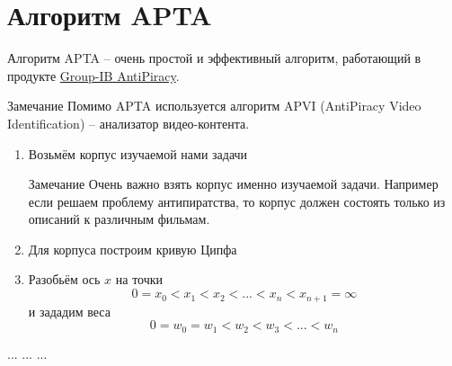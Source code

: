 \section{Алгоритм APTA}\label{section:APTA}


\begin{frame}{Алгоритм APTA}
	 -- 
	очень простой и эффективный алгоритм, работающий
	в продукте \href{https://www.group-ib.ru/antipiracy.html}{Group-IB AntiPiracy}.
	
	\begin{block}{Замечание}
	Помимо APTA используется алгоритм APVI (AntiPiracy Video Identification) 
	-- анализатор видео-контента. 
	\end{block}
\end{frame}

\begin{frame}
	\begin{enumerate}
		\item 
		Возьмём корпус изучаемой нами задачи
		
		\begin{block}{Замечание}
		Очень важно взять корпус именно изучаемой задачи.
		Например если решаем проблему антипиратства, то корпус должен состоять 
		только из описаний к различным фильмам.
		\end{block}
		\item Для корпуса построим кривую Ципфа
		\item Разобьём ось $x$ на точки 
		\begin{equation}
		0 = x_0 < x_1 < x_2 < ... < x_n < x_{n+1} = \infty
		\end{equation}
		и зададим веса
		\begin{equation}
		0 = w_0 = w_1 < w_2 < w_3 < ... < w_n 
		\end{equation}
	\end{enumerate}
	... ... ...
\end{frame}

